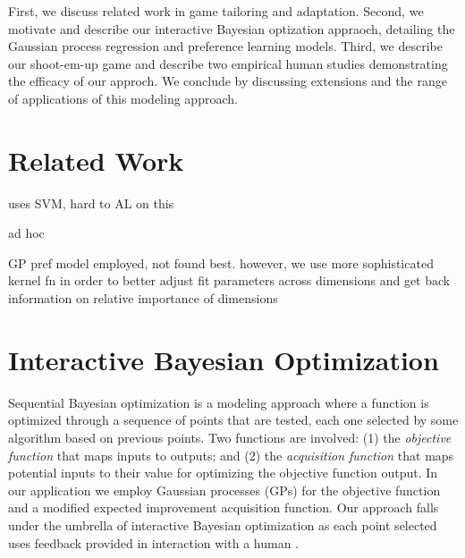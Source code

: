 \documentclass[letterpaper]{article}
\begin{document}

First, we discuss related work in game tailoring and adaptation. Second, we motivate and describe our interactive Bayesian optization appraoch, detailing the Gaussian process regression and preference learning models. Third, we describe our shoot-em-up game and describe two empirical human studies demonstrating the efficacy of our approch. We conclude by discussing extensions and the range of applications of this modeling approach.


\section{Related Work}

\cite{yu2011:minboredom} uses SVM, hard to AL on this

\cite{hunicke2004:dda} ad hoc

\cite{yannakakis2009:gameadapt} \cite{yannakakis2009:playermodel} GP pref model employed, not found best. however, we use more sophisticated kernel fn in order to better adjust fit parameters across dimensions and get back information on relative importance of dimensions

\cite{bakkes2012}

\section{Interactive Bayesian Optimization}
Sequential Bayesian optimization is a modeling approach where a function is optimized through a sequence of points that are tested, each one selected by some algorithm based on previous points. Two functions are involved: (1) the \textit{objective function} that maps inputs to outputs; and (2) the \textit{acquisition function} that maps potential inputs to their value for optimizing the objective function output. In our application we employ Gaussian processes (GPs) for the objective function and a modified expected improvement acquisition function. Our approach falls under the umbrella of interactive Bayesian optimization as each point selected uses feedback provided in interaction with a human \cite{brochu2010:thesis}.
\end{document}
